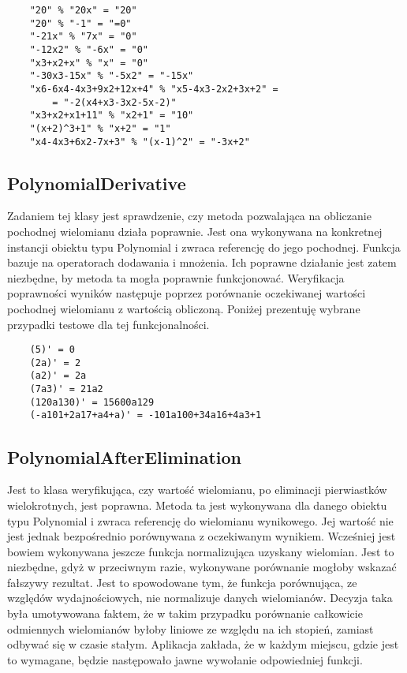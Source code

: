 \documentclass[oneside,a4paper]{book}
\begin{document}
	\begin{lstlisting}
	"20" % "20x" = "20"
	"20" % "-1" = "=0"
	"-21x" % "7x" = "0"
	"-12x2" % "-6x" = "0"
	"x3+x2+x" % "x" = "0"
	"-30x3-15x" % "-5x2" = "-15x"
	"x6-6x4-4x3+9x2+12x+4" % "x5-4x3-2x2+3x+2" =
	    = "-2(x4+x3-3x2-5x-2)"
	"x3+x2+x1+11" % "x2+1" = "10"
	"(x+2)^3+1" % "x+2" = "1"
	"x4-4x3+6x2-7x+3" % "(x-1)^2" = "-3x+2"
	\end{lstlisting}
	
	\subsection{PolynomialDerivative}
	
	Zadaniem tej klasy jest sprawdzenie, czy metoda pozwalająca na obliczanie pochodnej wielomianu działa poprawnie. Jest ona wykonywana na konkretnej instancji obiektu typu Polynomial i zwraca referencję do jego pochodnej. Funkcja bazuje na operatorach dodawania i mnożenia. Ich poprawne działanie jest zatem niezbędne, by metoda ta mogła poprawnie funkcjonować.
	Weryfikacja poprawności wyników następuje poprzez porównanie oczekiwanej wartości pochodnej wielomianu z wartością obliczoną. Poniżej prezentuję wybrane przypadki testowe dla tej funkcjonalności.
	
	\begin{lstlisting}
	(5)' = 0
	(2a)' = 2
	(a2)' = 2a
	(7a3)' = 21a2
	(120a130)' = 15600a129
	(-a101+2a17+a4+a)' = -101a100+34a16+4a3+1
	\end{lstlisting}
	
	\subsection{PolynomialAfterElimination}
	
	Jest to klasa weryfikująca, czy wartość wielomianu, po eliminacji pierwiastków wielokrotnych, jest poprawna. Metoda ta jest wykonywana dla danego obiektu typu Polynomial i zwraca referencję do wielomianu wynikowego. Jej wartość nie jest jednak bezpośrednio porównywana z oczekiwanym wynikiem. Wcześniej jest bowiem wykonywana jeszcze funkcja normalizująca uzyskany wielomian. Jest to niezbędne, gdyż w przeciwnym razie, wykonywane porównanie mogłoby wskazać fałszywy rezultat. Jest to spowodowane tym, że funkcja porównująca, ze względów wydajnościowych, nie normalizuje danych wielomianów. Decyzja taka była umotywowana faktem, że w takim przypadku porównanie całkowicie odmiennych wielomianów byłoby liniowe ze względu na ich stopień, zamiast odbywać się w czasie stałym. Aplikacja zakłada, że w każdym miejscu, gdzie jest to wymagane, będzie następowało jawne wywołanie odpowiedniej funkcji.
	
\end{document}
